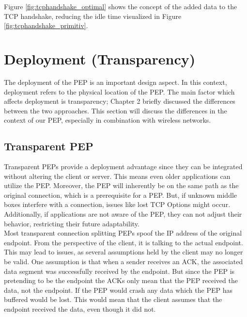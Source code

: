 \documentclass[a4paper,english, 11pt]{report}
\begin{document}
Figure \ref{fig:tcphandshake_optimal} shows the concept of the added data to the TCP handshake, reducing the idle time visualized in Figure \ref{fig:tcphandshake_primitiv}. 


\section{Deployment (Transparency)}
The deployment of the PEP is an important design aspect. In this context, deployment refers to the physical location of the PEP. The main factor which affects deployment is transparency; Chapter 2 briefly discussed the differences between the two approaches. This section will discuss the differences in the context of our PEP, especially in combination with wireless networks.

\subsection{Transparent PEP}
Transparent PEPs provide a deployment advantage since they can be integrated without altering the client or server. This means even older applications can utilize the PEP. Moreover, the PEP will inherently be on the same path as the original connection, which is a prerequisite for a PEP. But, if unknown middle boxes interfere with a connection, issues like lost TCP Options might occur. Additionally, if applications are not aware of the PEP, they can not adjust their behavior, restricting their future adaptability.\\

Most transparent connection splitting PEPs spoof the IP address of the original endpoint. From the perspective of the client, it is talking to the actual endpoint. This may lead to issues, as several assumptions held by the client may no longer be valid. One assumption is that when a sender receives an ACK, the associated data segment was successfully received by the endpoint. But since the PEP is pretending to be the endpoint the ACKs only mean that the PEP received the data, not the endpoint. If the PEP would crash any data which the PEP has buffered would be lost. This would mean that the client assumes that the endpoint received the data, even though it did not.
\end{document}
